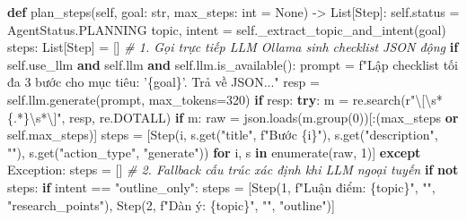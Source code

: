\documentclass[]{article}
\newenvironment{Shaded}{}{}
\newcommand{\BuiltInTok}[1]{#1}
\newcommand{\CommentTok}[1]{\textcolor[rgb]{0.38,0.63,0.69}{\textit{#1}}}
\newcommand{\ControlFlowTok}[1]{\textcolor[rgb]{0.00,0.44,0.13}{\textbf{#1}}}
\newcommand{\DecValTok}[1]{\textcolor[rgb]{0.25,0.63,0.44}{#1}}
\newcommand{\KeywordTok}[1]{\textcolor[rgb]{0.00,0.44,0.13}{\textbf{#1}}}
\newcommand{\NormalTok}[1]{#1}
\newcommand{\OperatorTok}[1]{\textcolor[rgb]{0.40,0.40,0.40}{#1}}
\newcommand{\PreprocessorTok}[1]{\textcolor[rgb]{0.74,0.48,0.00}{#1}}
\newcommand{\SpecialCharTok}[1]{\textcolor[rgb]{0.25,0.44,0.63}{#1}}
\newcommand{\SpecialStringTok}[1]{\textcolor[rgb]{0.73,0.40,0.53}{#1}}
\newcommand{\StringTok}[1]{\textcolor[rgb]{0.25,0.44,0.63}{#1}}
\newcommand{\VariableTok}[1]{\textcolor[rgb]{0.10,0.09,0.49}{#1}}
\newcommand{\VerbatimStringTok}[1]{\textcolor[rgb]{0.25,0.44,0.63}{#1}}
\begin{document}
\begin{Shaded}
\begin{Highlighting}[]
    \KeywordTok{def}\NormalTok{ plan_steps(}\VariableTok{self}\NormalTok{, goal: }\BuiltInTok{str}\NormalTok{, max_steps: }\BuiltInTok{int} \OperatorTok{=} \VariableTok{None}\NormalTok{) }\OperatorTok{->}\NormalTok{ List[Step]:}
        \VariableTok{self}\NormalTok{.status }\OperatorTok{=}\NormalTok{ AgentStatus.PLANNING}
\NormalTok{        topic, intent }\OperatorTok{=} \VariableTok{self}\NormalTok{._extract_topic_and_intent(goal)}
\NormalTok{        steps: List[Step] }\OperatorTok{=}\NormalTok{ []}
        \CommentTok{# 1. Gọi trực tiếp LLM Ollama sinh checklist JSON động}
        \ControlFlowTok{if} \VariableTok{self}\NormalTok{.use_llm }\KeywordTok{and} \VariableTok{self}\NormalTok{.llm }\KeywordTok{and} \VariableTok{self}\NormalTok{.llm.is_available():}
\NormalTok{            prompt }\OperatorTok{=} \SpecialStringTok{f"Lập checklist tối đa 3 bước cho mục tiêu: '}\SpecialCharTok{\{}\NormalTok{goal}\SpecialCharTok{\}}\SpecialStringTok{'. Trả về JSON..."}
\NormalTok{            resp }\OperatorTok{=} \VariableTok{self}\NormalTok{.llm.generate(prompt, max_tokens}\OperatorTok{=}\DecValTok{320}\NormalTok{)}
            \ControlFlowTok{if}\NormalTok{ resp:}
                \ControlFlowTok{try}\NormalTok{:}
\NormalTok{                    m }\OperatorTok{=}\NormalTok{ re.search(}\VerbatimStringTok{r"\textbackslash{}[\textbackslash{}s*\{.*\}\textbackslash{}s*\textbackslash{}]"}\NormalTok{, resp, re.DOTALL)}
                    \ControlFlowTok{if}\NormalTok{ m:}
\NormalTok{                        raw }\OperatorTok{=}\NormalTok{ json.loads(m.group(}\DecValTok{0}\NormalTok{))[:(max_steps }\KeywordTok{or} \VariableTok{self}\NormalTok{.max_steps)]}
\NormalTok{                        steps }\OperatorTok{=}\NormalTok{ [Step(i, s.get(}\StringTok{"title"}\NormalTok{, }\SpecialStringTok{f"Bước }\SpecialCharTok{\{i\}}\SpecialStringTok{"}\NormalTok{), s.get(}\StringTok{"description"}\NormalTok{, }\StringTok{""}\NormalTok{), s.get(}\StringTok{"action_type"}\NormalTok{, }\StringTok{"generate"}\NormalTok{)) }\ControlFlowTok{for}\NormalTok{ i, s }\KeywordTok{in} \BuiltInTok{enumerate}\NormalTok{(raw, }\DecValTok{1}\NormalTok{)]}
                \ControlFlowTok{except} \PreprocessorTok{Exception}\NormalTok{: steps }\OperatorTok{=}\NormalTok{ []}
        \CommentTok{# 2. Fallback cấu trúc xác định khi LLM ngoại tuyến}
        \ControlFlowTok{if} \KeywordTok{not}\NormalTok{ steps:}
            \ControlFlowTok{if}\NormalTok{ intent }\OperatorTok{==} \StringTok{"outline_only"}\NormalTok{: steps }\OperatorTok{=}\NormalTok{ [Step(}\DecValTok{1}\NormalTok{, }\SpecialStringTok{f"Luận điểm: }\SpecialCharTok{\{}\NormalTok{topic}\SpecialCharTok{\}}\SpecialStringTok{"}\NormalTok{, }\StringTok{""}\NormalTok{, }\StringTok{"research_points"}\NormalTok{), Step(}\DecValTok{2}\NormalTok{, }\SpecialStringTok{f"Dàn ý: }\SpecialCharTok{\{}\NormalTok{topic}\SpecialCharTok{\}}\SpecialStringTok{"}\NormalTok{, }\StringTok{""}\NormalTok{, }\StringTok{"outline"}\NormalTok{)]}

\end{Highlighting}
\end{Shaded}
\end{document}

